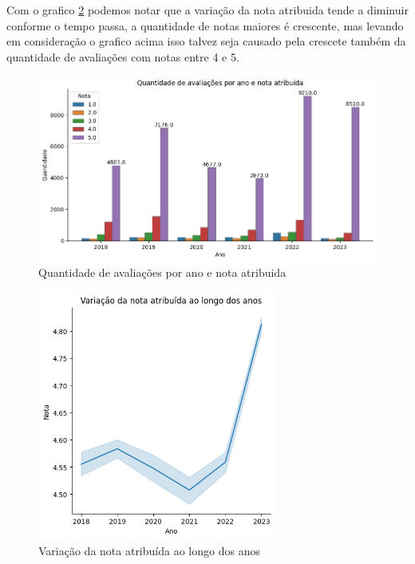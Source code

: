 Com o grafico \ref{img:relplot_ano_rating} podemos notar que a variação da nota atribuida tende a diminuir conforme o tempo passa, a quantidade de notas maiores é crescente, mas levando em consideração o grafico acima isso talvez seja causado pela crescete também da quantidade de avaliações com notas entre 4 e 5.
\begin{figure}
	\centering
	\includegraphics[width=1\textwidth]{figs/exploratoria/quantidade_avaliacao_nota_atribuida_ano.png}
	\caption{Quantidade de avaliações por ano e nota atribuida}
	\label{img:dist_review_rating_per_year}
\end{figure}

\begin{figure}
	\centering
	\includegraphics[width=0.70\textwidth]{figs/exploratoria/relplot_ano_rating.png}
	\caption{Variação da nota atribuída ao longo dos anos}
	\label{img:relplot_ano_rating}
\end{figure}


